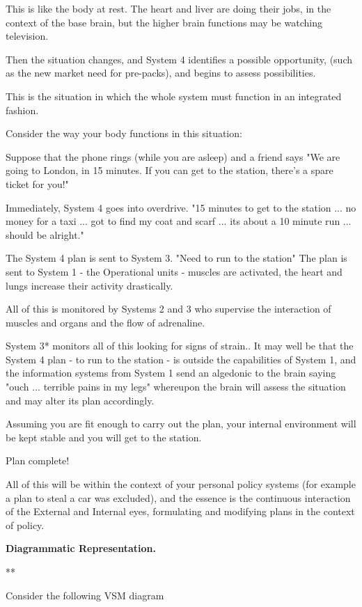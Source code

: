 This is like the body at rest. The heart and liver are doing their jobs, in the context of the base brain, but the higher brain functions may be watching television.

Then the situation changes, and System 4 identifies a possible opportunity, (such as the new market need for pre-packs), and begins to assess possibilities.

This is the situation in which the whole system must function in an integrated fashion.

Consider the way your body functions in this situation:

Suppose that the phone rings (while you are asleep) and a friend says "We are going to London, in 15 minutes. If you can get to the station, there's a spare ticket for you!"

Immediately, System 4 goes into overdrive. "15 minutes to get to the station ... no money for a taxi ... got to find my coat and scarf ... its about a 10 minute run ... should be alright."

The System 4 plan is sent to System 3. "Need to run to the station" The plan is sent to System 1 - the Operational units - muscles are activated, the heart and lungs increase their activity drastically.

All of this is monitored by Systems 2 and 3 who supervise the interaction of muscles and organs and the flow of adrenaline.

System 3* monitors all of this looking for signs of strain.. It may well be that the System 4 plan - to run to the station - is outside the capabilities of System 1, and the information systems from System 1 send an algedonic to the brain saying "ouch ... terrible pains in my legs" whereupon the brain will assess the situation and may alter its plan accordingly.

Assuming you are fit enough to carry out the plan, your internal environment will be kept stable and you will get to the station.

Plan complete!

All of this will be within the context of your personal policy systems (for example a plan to steal a car was excluded), and the essence is the continuous interaction of the External and Internal eyes, formulating and modifying plans in the context of policy.

\textbf{Diagrammatic Representation.}

**

Consider the following VSM diagram

